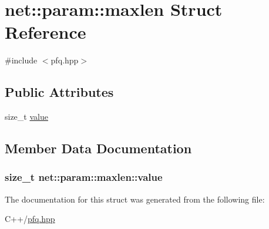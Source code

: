 \hypertarget{structnet_1_1param_1_1maxlen}{\section{net\-:\-:param\-:\-:maxlen Struct Reference}
\label{structnet_1_1param_1_1maxlen}
}


{\ttfamily \#include $<$pfq.\-hpp$>$}

\subsection*{Public Attributes}
\begin{DoxyCompactItemize}
\item 
size\-\_\-t \hyperlink{structnet_1_1param_1_1maxlen_aa6980872f44af9803747a76004a1c55a}{value}
\end{DoxyCompactItemize}


\subsection{Member Data Documentation}
\hypertarget{structnet_1_1param_1_1maxlen_aa6980872f44af9803747a76004a1c55a}{
\subsubsection[{value}]{\setlength{\rightskip}{0pt plus 5cm}size\-\_\-t net\-::param\-::maxlen\-::value}}\label{structnet_1_1param_1_1maxlen_aa6980872f44af9803747a76004a1c55a}


The documentation for this struct was generated from the following file\-:\begin{DoxyCompactItemize}
\item 
C++/\hyperlink{pfq_8hpp}{pfq.\-hpp}\end{DoxyCompactItemize}
